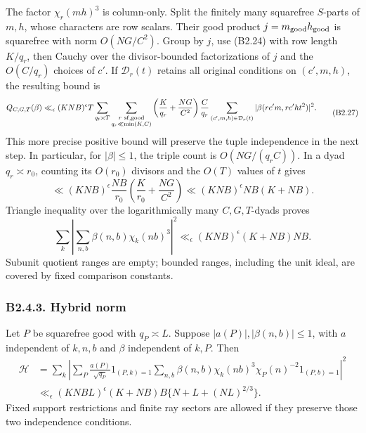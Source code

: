 \documentclass[11pt,a4paper]{article}
\begin{document}
The factor \(\chi_r(mh)^3\) is column-only. Split the finitely many
squarefree \(S\)-parts of \(m,\allowbreak{}h\), whose characters are row scalars.
Their good product \(j=m_{\rm good}h_{\rm good}\) is squarefree with
norm \(O(NG/C^2)\). Group by \(j\), use (B2.24) with row length
\(K/q_r\), then Cauchy over the divisor-bounded factorizations of \(j\)
and the \(O(C/q_r)\) choices of \(c'\). If \(\mathcal D_r(t)\) retains
all original conditions on \((c',\allowbreak{}m,\allowbreak{}h)\), the resulting bound is \[
\begin{aligned}
Q_{C,G,T}(\beta)
\ll_\epsilon (KNB)^\epsilon T
\sum_{q_t\asymp T}
\sum_{\substack{r\ {\rm sf,good}\\q_r\ll\min(K,C)}}
\left(\frac K{q_r}+\frac{NG}{C^2}\right)\frac C{q_r}
\sum_{(c',m,h)\in\mathcal D_r(t)}
|\beta(rc'm,rc'ht^2)|^2.
\end{aligned}
\tag{B2.27}
\] This more precise positive bound will preserve the tuple independence
in the next step. In particular, for \(|\beta|\le1\), the triple count
is \(O(NG/(q_rC))\). In a dyad \(q_r\asymp r_0\), counting its
\(O(r_0)\) divisors and the \(O(T)\) values of \(t\) gives \[
\ll (KNB)^\epsilon\frac{NB}{r_0}
\left(\frac K{r_0}+\frac{NG}{C^2}\right)
\ll(KNB)^\epsilon NB(K+NB).
\] Triangle inequality over the logarithmically many \(C,\allowbreak{}G,\allowbreak{}T\)-dyads
proves \[
\sum_k\left|\sum_{n,b}\beta(n,b)\chi_k(nb)^3\right|^2
\ll_\epsilon(KNB)^\epsilon(K+NB)NB.
\tag{B2.28}
\] Subunit quotient ranges are empty; bounded ranges, including the unit
ideal, are covered by fixed comparison constants.

\hypertarget{b2.4.3.-hybrid-norm}{%
\subsubsection{B2.4.3. Hybrid norm}\label{b2.4.3.-hybrid-norm}}

Let \(P\) be squarefree good with \(q_P\asymp L\). Suppose
\(|a(P)|,\allowbreak{}|\beta(n,\allowbreak{}b)|\le1\), with \(a\) independent of \(k,\allowbreak{}n,\allowbreak{}b\) and
\(\beta\) independent of \(k,\allowbreak{}P\). Then \[
\begin{aligned}
\mathcal H&=
\sum_k\left|
\sum_P\frac{a(P)}{\sqrt{q_P}}1_{(P,k)=1}
\sum_{n,b}\beta(n,b)\chi_k(nb)^3\chi_P(n)^{-2}1_{(P,b)=1}
\right|^2\\
&\ll_\epsilon(KNBL)^\epsilon
(K+NB)B\{N+L+(NL)^{2/3}\}.
\end{aligned}
\tag{B2.29}
\] Fixed support restrictions and finite ray sectors are allowed if they
preserve those two independence conditions.
\end{document}
